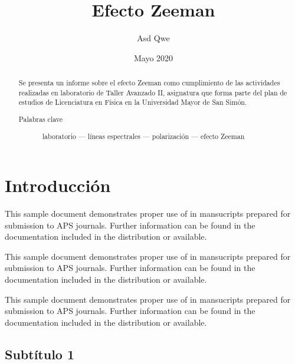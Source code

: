 \documentclass[%
 reprint,
 amsmath,amssymb,
 aps,
]{revtex4-2}
\begin{document}

\title{Efecto Zeeman}%

\author{Asd Qwe}%
%

\makeatletter
\def\Dated@name{} %
\makeatother

\date{Mayo 2020}

\begin{abstract}
 Se presenta un informe sobre el efecto Zeeman como cumplimiento de las actividades realizadas en laboratorio de Taller Avanzado II, asignatura que forma parte del plan de estudios de Licenciatura en Física en la Universidad Mayor de San Simón.
\begin{description}
\item[Palabras clave] laboratorio — líneas espectrales — polarización — efecto Zeeman
\end{description}
\end{abstract}

\maketitle


\section{\label{sec:level1}Introducción}

This sample document demonstrates proper use of in mansucripts prepared for submission to APS journals. Further information can be found in the documentation included in the distribution or available.

This sample document demonstrates proper use of in mansucripts prepared for submission to APS journals. Further information can be found in the documentation included in the distribution or available.

This sample document demonstrates proper use of in mansucripts prepared for submission to APS journals. Further information can be found in the documentation included in the distribution or available.

\subsection{Subtítulo 1}
\end{document}

